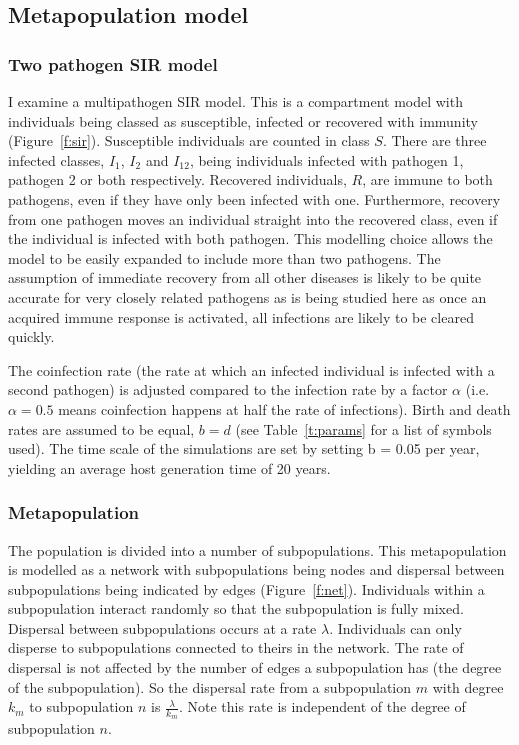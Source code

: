 



\subsection{Metapopulation model}




\subsubsection{Two pathogen SIR model}

I examine a multipathogen SIR model. 
This is a compartment model with individuals being classed as susceptible, infected or recovered with immunity (Figure~\ref{f:sir}).
Susceptible individuals are counted in class $S$.
There are three infected classes, $I_1$, $I_2$ and $I_{12}$, being individuals infected with pathogen 1, pathogen 2 or both respectively.
Recovered individuals, $R$, are immune to both pathogens, even if they have only been infected with one.
Furthermore, recovery from one pathogen moves an individual straight into the recovered class, even if the individual is infected with both pathogen.
This modelling choice allows the model to be easily expanded to include more than two pathogens.
The assumption of immediate recovery from all other diseases is likely to be quite accurate for very closely related pathogens as is being studied here as once an acquired immune response is activated, all infections are likely to be cleared quickly.

The coinfection rate (the rate at which an infected individual is infected with a second pathogen) is adjusted compared to the infection rate by a factor $\alpha$ (i.e. $\alpha = 0.5$ means coinfection happens at half the rate of infections).
Birth and death rates are assumed to be equal, $b = d$ (see Table~\ref{t:params} for a list of symbols used).
The time scale of the simulations are set by setting b = 0.05 per year, yielding an average host generation time of 20 years.


\subsubsection{Metapopulation}


The population is divided into a number of subpopulations.
This metapopulation is modelled as a network with subpopulations being nodes and dispersal between subpopulations being indicated by edges (Figure~\ref{f:net}).
Individuals within a subpopulation interact randomly so that the subpopulation is fully mixed.
Dispersal between subpopulations occurs at a rate $\lambda$.
Individuals can only disperse to subpopulations connected to theirs in the network.
The rate of dispersal is not affected by the number of edges a subpopulation has (the degree of the subpopulation).
So the dispersal rate from a subpopulation $m$ with degree $k_m$ to subpopulation $n$ is $\frac{\lambda}{k_m}$.
Note this rate is independent of the degree of subpopulation $n$.





